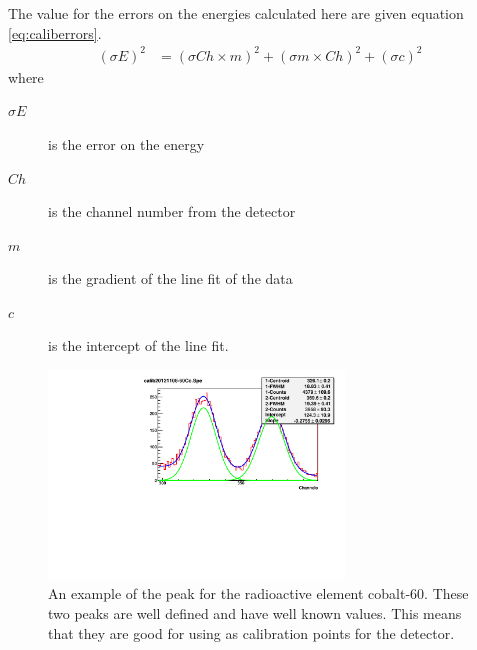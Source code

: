 The value for the errors on the energies calculated here are given equation \ref{eq:caliberrors}.
\begin{align}
	\left(\sigma E\right)^2 &= \left(\sigma Ch\times m\right)^2 + \left(\sigma m\times Ch\right)^2 + \left(\sigma c\right)^2 \label{eq:caliberrors}	
\end{align}
where
\begin{description}
	\item[$\sigma E$] is the error on the energy
	\item[$Ch$] is the channel number from the detector
	\item[$m$] is the gradient of the line fit of the data
	\item[$c$] is the intercept of the line fit.
\end{description}

\begin{figure}[ht]
	\centering
	\includegraphics[width=0.7\textwidth]{calib20121113-60Co.pdf}
	\caption{An example of the peak for the radioactive element cobalt-60. These two peaks are well defined and have well known values. This means that they are good for using as calibration points for the detector.\label{fig:tankspecbuffit}}
\end{figure}


